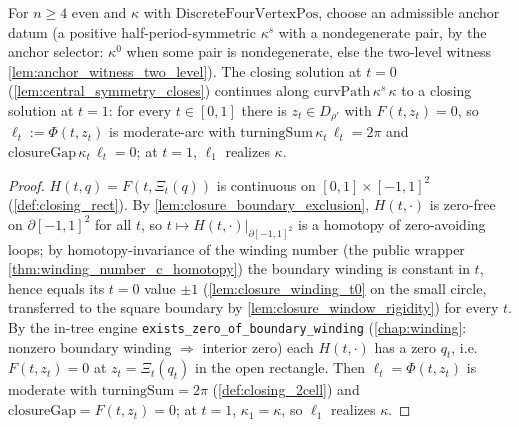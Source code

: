 \begin{lemma}
  \label{lem:closure_persists}
  For $n \ge 4$ even and $\kappa$ with $\mathrm{DiscreteFourVertexPos}$, choose
  an admissible anchor datum (a positive half-period-symmetric $\kappa^s$ with
  a nondegenerate pair, by the anchor selector: $\kappa^0$ when some pair is
  nondegenerate, else the two-level witness
  \cref{lem:anchor_witness_two_level}). The closing solution at $t = 0$
  (\cref{lem:central_symmetry_closes}) continues along
  $\mathrm{curvPath}\,\kappa^s\,\kappa$ to a closing solution at $t = 1$: for
  every $t \in [0,1]$ there is $z_t \in D_{\rho'}$
  with $F(t,z_t) = 0$, so $\ell_t := \Phi(t,z_t)$ is moderate-arc with
  $\mathrm{turningSum}\,\kappa_t\,\ell_t = 2\pi$ and
  $\mathrm{closureGap}\,\kappa_t\,\ell_t = 0$; at $t=1$, $\ell_1$ realizes $\kappa$.
\end{lemma}
\begin{proof}
  $H(t,q) = F(t,\Xi_t(q))$ is continuous on $[0,1]\times[-1,1]^2$
  (\cref{def:closing_rect}). By \cref{lem:closure_boundary_exclusion},
  $H(t,\cdot)$ is zero-free on $\partial[-1,1]^2$ for all $t$, so
  $t \mapsto H(t,\cdot)|_{\partial[-1,1]^2}$ is a homotopy of zero-avoiding
  loops; by homotopy-invariance of the winding number (the public wrapper
  \cref{thm:winding_number_c_homotopy}) the
  boundary winding is constant in $t$, hence equals its $t=0$ value $\pm1$
  (\cref{lem:closure_winding_t0} on the small circle, transferred to the
  square boundary by \cref{lem:closure_window_rigidity}) for every $t$. By the
  in-tree engine \texttt{exists\_zero\_of\_boundary\_winding}
  (\cref{chap:winding}: nonzero boundary winding $\Rightarrow$ interior zero)
  each $H(t,\cdot)$ has a zero $q_t$, i.e.\ $F(t, z_t) = 0$ at
  $z_t = \Xi_t(q_t)$ in the open rectangle. Then $\ell_t = \Phi(t,z_t)$ is
  moderate with $\mathrm{turningSum} = 2\pi$ (\cref{def:closing_2cell}) and
  $\mathrm{closureGap} = F(t,z_t) = 0$; at $t=1$, $\kappa_1 = \kappa$, so
  $\ell_1$ realizes $\kappa$.
\end{proof}

